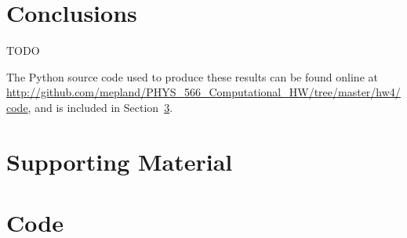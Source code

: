 \documentclass[notitlepage,aps,prd,nofootinbib]{revtex4-1}
\begin{document}
\begin{comment}
\begin{figure}[!htbc]
  \centering
  \texttt{[image: ]}
	{\par\nobreak\rule[9pt]{35em}{0.5pt}\vspace{-5mm}}
	\caption{}
	\label{fig:}
\end{figure}
\end{comment}

\section{Conclusions}
\label{sec:Conclusions}
TODO

The Python source code used to produce these results can be found online at \url{http://github.com/mepland/PHYS_566_Computational_HW/tree/master/hw4/code}, and is included in Section~\ref{sec:code}.

\clearpage
\section{Supporting Material}
\label{sec:Supporting_Material}


\clearpage


\clearpage
\section{Code}
\label{sec:code}


\end{document}
